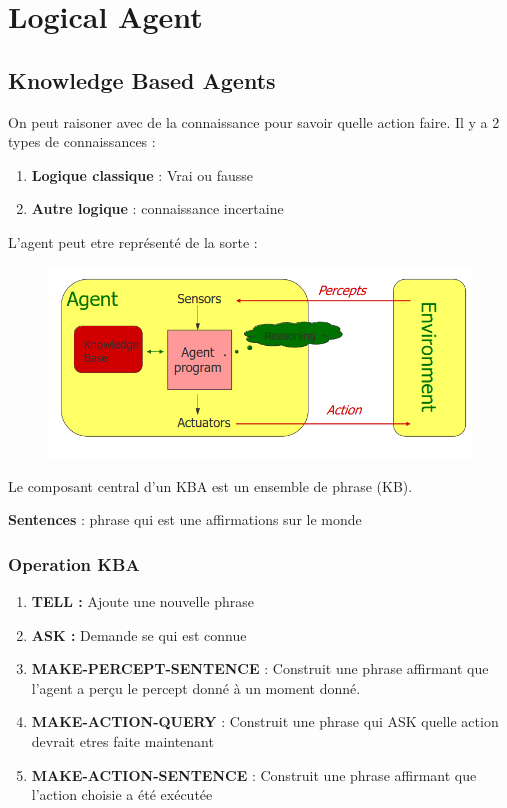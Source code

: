 \section{Logical Agent}
	\subsection{Knowledge Based Agents}
		On peut raisoner avec de la connaissance pour savoir quelle action faire. Il y a 2 types de connaissances :
		\begin{enumerate}
			\item \textbf{Logique classique} : Vrai ou fausse
			\item \textbf{Autre logique} : connaissance incertaine
		\end{enumerate}
		
		L'agent peut etre représenté de la sorte : 
		\begin{figure}[htp]
			\centering
			\includegraphics[width=\textwidth]{img/KBA.png}
		\end{figure}
		
		
		Le composant central d'un KBA est un ensemble de phrase (KB).
		
		\textbf{Sentences} : phrase qui est une affirmations sur le monde
			
			
		\subsubsection{Operation KBA}
			\begin{enumerate}
				\item \textbf{TELL :} Ajoute une nouvelle phrase
				\item \textbf{ASK :} Demande se qui est connue
				\item \textbf{MAKE-PERCEPT-SENTENCE} : Construit une phrase affirmant que l'agent a perçu le percept donné à un moment donné.
				\item \textbf{MAKE-ACTION-QUERY} : Construit une phrase qui ASK quelle action devrait etres faite maintenant
				\item \textbf{MAKE-ACTION-SENTENCE} : Construit une phrase affirmant que l'action choisie a été exécutée
			\end{enumerate}
			
